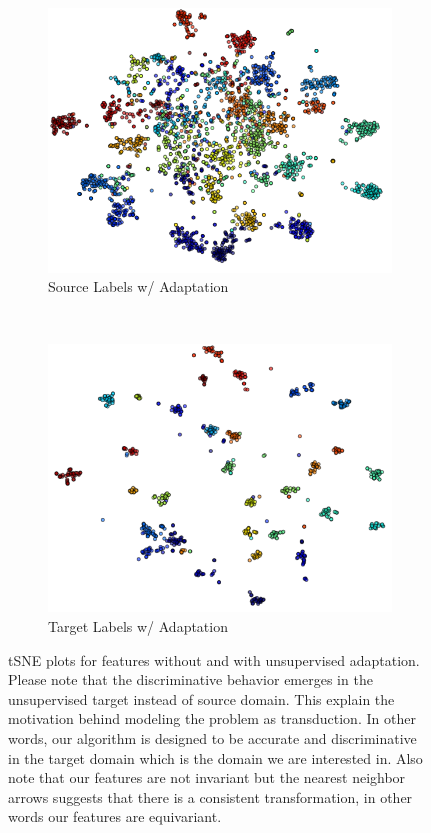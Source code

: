 \begin{figure}[ht]
    \begin{subfigure}[b]{0.5\textwidth}
        \includegraphics[width=\textwidth]{sc.png}
        \caption{Source Labels w/ Adaptation}
        \label{fig:gull}
    \end{subfigure}~\begin{subfigure}[b]{0.5\textwidth}
        \includegraphics[width=\textwidth]{tc.png}
        \caption{Target Labels w/ Adaptation}
    \end{subfigure}
\caption{tSNE plots for features without and with unsupervised adaptation. Please note that the discriminative behavior emerges in the unsupervised target instead of source domain. This explain the motivation behind modeling the problem as transduction. In other words, our algorithm is designed to be accurate and discriminative in the target domain which is the domain we are interested in. Also note that our features are not invariant but the nearest neighbor arrows suggests that there is a consistent transformation, in other words our features are equivariant. }
\label{fig:tsne}
\end{figure}

